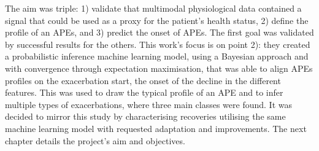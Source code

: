 The aim was triple: 1) validate that multimodal physiological data contained a signal that could be used as a proxy for the patient's health status, 2) define the profile of an APEs, and 3) predict the onset of APEs. The first goal was validated by successful results for the others. This work's focus is on point 2): they created a probabilistic inference machine learning model, using a Bayesian approach and with convergence through expectation maximisation, that was able to align APEs profiles on the exacerbation start, the onset of the decline in the different features. This was used to draw the typical profile of an APE and to infer multiple types of exacerbations, where three main classes were found. It was decided to mirror this study by characterising recoveries utilising the same machine learning model with requested adaptation and improvements. The next chapter details the project's aim and objectives.
